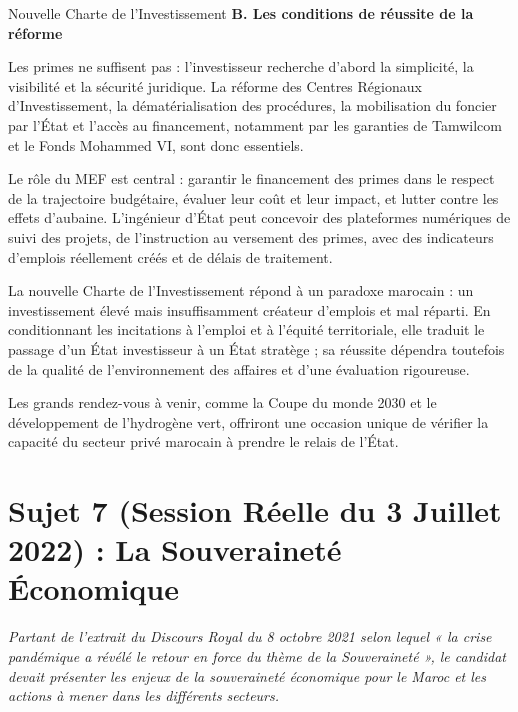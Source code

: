 \begin{copiemodele}{Nouvelle Charte de l'Investissement}
\textbf{B. Les conditions de réussite de la réforme}

Les primes ne suffisent pas : l'investisseur recherche d'abord la simplicité, la visibilité et la sécurité juridique. La réforme des Centres Régionaux d'Investissement, la dématérialisation des procédures, la mobilisation du foncier par l'État et l'accès au financement, notamment par les garanties de Tamwilcom et le Fonds Mohammed VI, sont donc essentiels.

Le rôle du MEF est central : garantir le financement des primes dans le respect de la trajectoire budgétaire, évaluer leur coût et leur impact, et lutter contre les effets d'aubaine. L'ingénieur d'État peut concevoir des plateformes numériques de suivi des projets, de l'instruction au versement des primes, avec des indicateurs d'emplois réellement créés et de délais de traitement.

La nouvelle Charte de l'Investissement répond à un paradoxe marocain : un investissement élevé mais insuffisamment créateur d'emplois et mal réparti. En conditionnant les incitations à l'emploi et à l'équité territoriale, elle traduit le passage d'un État investisseur à un État stratège ; sa réussite dépendra toutefois de la qualité de l'environnement des affaires et d'une évaluation rigoureuse.

Les grands rendez-vous à venir, comme la Coupe du monde 2030 et le développement de l'hydrogène vert, offriront une occasion unique de vérifier la capacité du secteur privé marocain à prendre le relais de l'État.
\end{copiemodele}

\section{Sujet 7 (Session Réelle du 3 Juillet 2022) : La Souveraineté Économique}

\begin{tcolorbox}[colback=blue!5!white,colframe=blue!75!black,title=\textbf{Énoncé Réel (3 Juillet 2022, Sujet 2 au choix)}]
\textit{Partant de l'extrait du Discours Royal du 8 octobre 2021 selon lequel « la crise pandémique a révélé le retour en force du thème de la Souveraineté », le candidat devait présenter les enjeux de la souveraineté économique pour le Maroc et les actions à mener dans les différents secteurs.} 
\end{tcolorbox}

